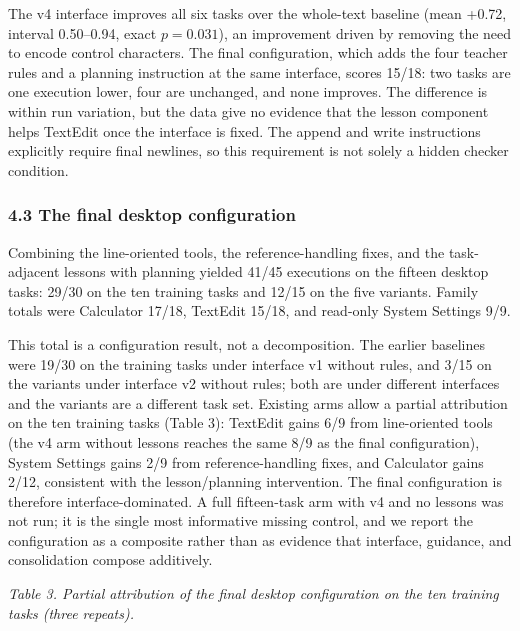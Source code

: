 \documentclass[
  10pt,
]{article}
\newcounter{none} %
\begin{document}
The v4 interface improves all six tasks over the whole-text baseline
(mean +0.72, interval 0.50--0.94, exact \(p=0.031\)), an improvement
driven by removing the need to encode control characters. The final
configuration, which adds the four teacher rules and a planning
instruction at the same interface, scores 15/18: two tasks are one
execution lower, four are unchanged, and none improves. The difference
is within run variation, but the data give no evidence that the lesson
component helps TextEdit once the interface is fixed. The append and
write instructions explicitly require final newlines, so this
requirement is not solely a hidden checker condition.

\subsubsection{4.3 The final desktop
configuration}\label{the-final-desktop-configuration}

Combining the line-oriented tools, the reference-handling fixes, and the
task-adjacent lessons with planning yielded 41/45 executions on the
fifteen desktop tasks: 29/30 on the ten training tasks and 12/15 on the
five variants. Family totals were Calculator 17/18, TextEdit 15/18, and
read-only System Settings 9/9.

This total is a configuration result, not a decomposition. The earlier
baselines were 19/30 on the training tasks under interface v1 without
rules, and 3/15 on the variants under interface v2 without rules; both
are under different interfaces and the variants are a different task
set. Existing arms allow a partial attribution on the ten training tasks
(Table 3): TextEdit gains 6/9 from line-oriented tools (the v4 arm
without lessons reaches the same 8/9 as the final configuration), System
Settings gains 2/9 from reference-handling fixes, and Calculator gains
2/12, consistent with the lesson/planning intervention. The final
configuration is therefore interface-dominated. A full fifteen-task arm
with v4 and no lessons was not run; it is the single most informative
missing control, and we report the configuration as a composite rather
than as evidence that interface, guidance, and consolidation compose
additively.

\emph{Table 3. Partial attribution of the final desktop configuration on
the ten training tasks (three repeats).}
\end{document}
